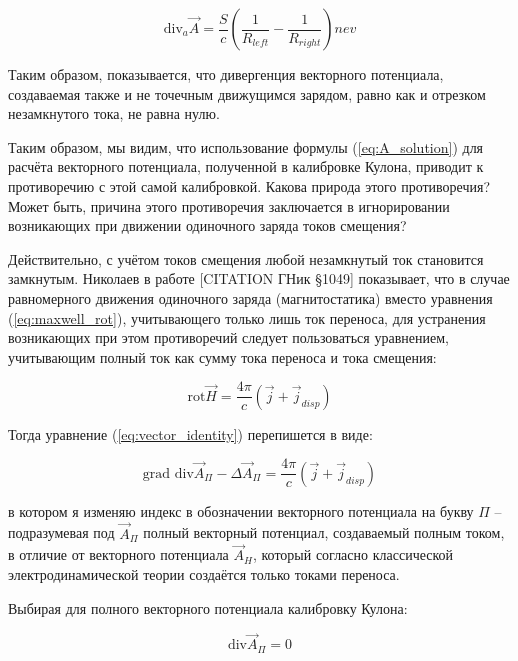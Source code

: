\documentclass[12pt, a4paper]{article}
\begin{document}
\begin{equation}
\text{div}_a \vec{A} = \frac{S}{c} \left( \frac{1}{R_{left}} - \frac{1}{R_{right}} \right) nev
\label{eq:div_A_cylinder_final}
\end{equation}

Таким образом, показывается, что дивергенция векторного потенциала, создаваемая также и не точечным движущимся зарядом, равно как и отрезком незамкнутого тока, не равна нулю.

Таким образом, мы видим, что использование формулы (\ref{eq:A_solution}) для расчёта векторного потенциала, полученной в калибровке Кулона, приводит к противоречию с этой самой калибровкой. Какова природа этого противоречия? Может быть, причина этого противоречия заключается в игнорировании возникающих при движении одиночного заряда токов смещения?

Действительно, с учётом токов смещения любой незамкнутый ток становится замкнутым. Николаев в работе [CITATION ГНик §1049] показывает, что в случае равномерного движения одиночного заряда (магнитостатика) вместо уравнения (\ref{eq:maxwell_rot}), учитывающего только лишь ток переноса, для устранения возникающих при этом противоречий следует пользоваться уравнением, учитывающим полный ток как сумму тока переноса и тока смещения:

\begin{equation}
\text{rot} \vec{H} = \frac{4\pi}{c} (\vec{j} + \vec{j}_{disp})
\label{eq:maxwell_full}
\end{equation}

Тогда уравнение (\ref{eq:vector_identity}) перепишется в виде:

\begin{equation}
\text{grad div} \vec{A}_{\Pi} - \Delta \vec{A}_{\Pi} = \frac{4\pi}{c} (\vec{j} + \vec{j}_{disp})
\label{eq:vector_identity_full}
\end{equation}

в котором я изменяю индекс в обозначении векторного потенциала на букву $\Pi$ -- подразумевая под $\vec{A}_{\Pi}$ полный векторный потенциал, создаваемый полным током, в отличие от векторного потенциала $\vec{A}_H$, который согласно классической электродинамической теории создаётся только токами переноса.

Выбирая для полного векторного потенциала калибровку Кулона:

\begin{equation}
\text{div} \vec{A}_{\Pi} = 0
\label{eq:coulomb_gauge_full}
\end{equation}
\end{document}

